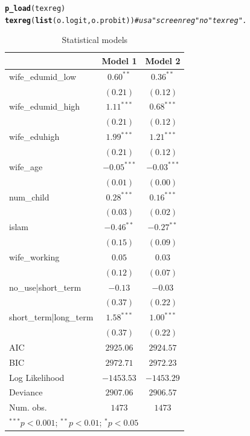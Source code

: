 \documentclass[onesided]{article}\usepackage[]{graphicx}\usepackage[]{color}
\makeatletter
\newcommand{\hlcom}[1]{\textcolor[rgb]{0.678,0.584,0.686}{\textit{#1}}}%
\newcommand{\hlstd}[1]{\textcolor[rgb]{0.345,0.345,0.345}{#1}}%
\newcommand{\hlkwd}[1]{\textcolor[rgb]{0.737,0.353,0.396}{\textbf{#1}}}%
\newenvironment{kframe}{%
 \def\at@end@of@kframe{}%
 \ifinner\ifhmode%
  \def\at@end@of@kframe{\end{minipage}}%
  \begin{minipage}{\columnwidth}%
 \fi\fi%
 \def\FrameCommand##1{\hskip\@totalleftmargin \hskip-\fboxsep
 \colorbox{shadecolor}{##1}\hskip-\fboxsep
     \hskip-\linewidth \hskip-\@totalleftmargin \hskip\columnwidth}%
 \MakeFramed {\advance\hsize-\width
   \@totalleftmargin\z@ \linewidth\hsize
   \@setminipage}}%
 {\par\unskip\endMakeFramed%
 \at@end@of@kframe}
\makeatother
\begin{document}
\begin{kframe}
\begin{alltt}
\hlkwd{p_load}\hlstd{(texreg)}
\hlkwd{texreg}\hlstd{(}\hlkwd{list}\hlstd{(o.logit, o.probit))} \hlcom{# usa "screenreg" no "texreg".}
\end{alltt}
\end{kframe}
\begin{table}
\begin{center}
\begin{tabular}{l c c}
\hline
 & Model 1 & Model 2 \\
\hline
wife\_edumid\_low      & $0.60^{**}$   & $0.36^{**}$   \\
                       & $(0.21)$      & $(0.12)$      \\
wife\_edumid\_high     & $1.11^{***}$  & $0.68^{***}$  \\
                       & $(0.21)$      & $(0.12)$      \\
wife\_eduhigh          & $1.99^{***}$  & $1.21^{***}$  \\
                       & $(0.21)$      & $(0.12)$      \\
wife\_age              & $-0.05^{***}$ & $-0.03^{***}$ \\
                       & $(0.01)$      & $(0.00)$      \\
num\_child             & $0.28^{***}$  & $0.16^{***}$  \\
                       & $(0.03)$      & $(0.02)$      \\
islam                  & $-0.46^{**}$  & $-0.27^{**}$  \\
                       & $(0.15)$      & $(0.09)$      \\
wife\_working          & $0.05$        & $0.03$        \\
                       & $(0.12)$      & $(0.07)$      \\
no\_use|short\_term    & $-0.13$       & $-0.03$       \\
                       & $(0.37)$      & $(0.22)$      \\
short\_term|long\_term & $1.58^{***}$  & $1.00^{***}$  \\
                       & $(0.37)$      & $(0.22)$      \\
\hline
AIC                    & $2925.06$     & $2924.57$     \\
BIC                    & $2972.71$     & $2972.23$     \\
Log Likelihood         & $-1453.53$    & $-1453.29$    \\
Deviance               & $2907.06$     & $2906.57$     \\
Num. obs.              & $1473$        & $1473$        \\
\hline
\multicolumn{3}{l}{\scriptsize{$^{***}p<0.001$; $^{**}p<0.01$; $^{*}p<0.05$}}
\end{tabular}
\caption{Statistical models}
\label{table:coefficients}
\end{center}
\end{table}
\end{document}
